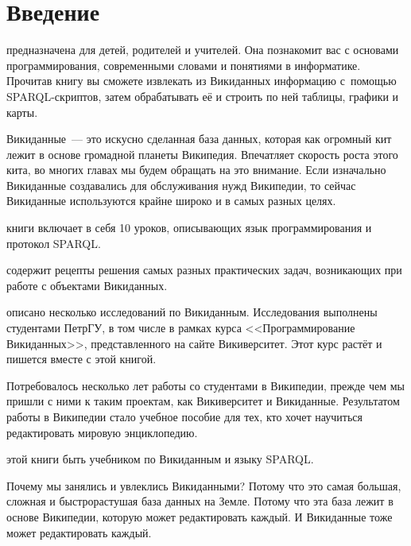 \chapter*{Введение}
\label{ch:intro}

 предназначена для детей, родителей и учителей. 
Она познакомит вас с основами программирования, современными словами и понятиями в информатике. 
Прочитав книгу вы сможете извлекать из Викиданных информацию с~помощью SPARQL-скриптов, 
затем обрабатывать её и строить по ней таблицы, графики и карты.

Викиданные~--- это искусно сделанная база данных, которая как огромный кит лежит в основе громадной планеты Википедия. Впечатляет скорость роста этого кита, во многих главах мы будем обращать на это внимание.
Если изначально Викиданные создавались %
для обслуживания нужд Википедии, 
то сейчас Викиданные используются крайне широко и в самых разных целях.

 книги включает в себя 10 уроков, описывающих язык программирования и протокол SPARQL.

 содержит рецепты решения самых разных практических задач, 
возникающих при работе с объектами Викиданных.

 описано несколько исследований по Викиданным. 
Исследования выполнены студентами ПетрГУ, в том числе в рамках курса <<Программирование Викиданных>>, 
представленного на сайте Викиверситет. 
Этот курс растёт и пишется вместе с этой книгой. 

Потребовалось несколько лет работы со студентами в Википедии, прежде чем мы пришли с ними к таким проектам, 
как Викиверситет и Викиданные. Результатом работы в Википедии стало учебное пособие для тех, 
кто хочет научиться редактировать мировую энциклопедию\cite{Krizhanovsky2015}.


 этой книги быть учебником по Викиданным и языку SPARQL.



Почему мы занялись и увлеклись Викиданными? 
Потому что это самая большая, сложная 
и быстрорастушая база данных на Земле. 
Потому что эта база лежит в основе Википедии, которую может редактировать каждый.
И Викиданные тоже может редактировать каждый. 

